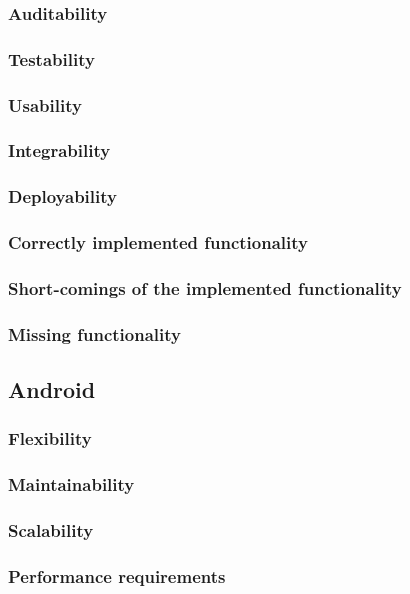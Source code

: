 \documentclass{article}
\begin{document}
        \subsubsection{Auditability}
        \subsubsection{Testability}
        \subsubsection{Usability}
        \subsubsection{Integrability}
        \subsubsection{Deployability}
        \subsubsection{Correctly implemented functionality}
        \subsubsection{Short-comings of the implemented functionality}
        \subsubsection{Missing functionality}
\subsection{Android}
        \subsubsection{Flexibility}
        \subsubsection{Maintainability}
        \subsubsection{Scalability}
        \subsubsection{Performance requirements}
\end{document}
